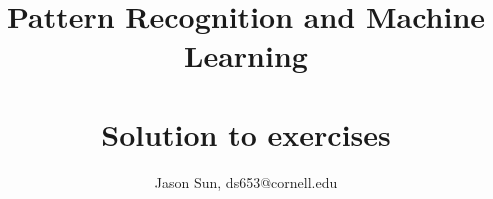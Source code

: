 \title{Pattern Recognition and Machine Learning \\ \hfill \\ Solution to exercises }

\author{Jason Sun, ds653@cornell.edu}








